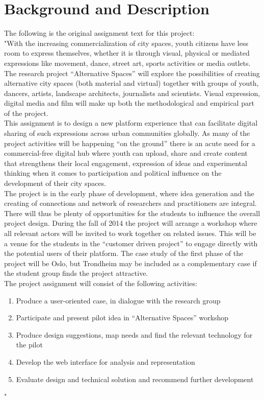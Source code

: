 \section{Background and Description}
The following is the original assignment text for this project: \\
\indent "With the increasing commercialization of city spaces, youth citizens have less room to express themselves, whether it is through visual, physical or mediated expressions like movement, dance, street art, sports activities or media outlets. The research project “Alternative Spaces” will explore the possibilities of creating alternative city spaces (both material and virtual) together with groups of youth, dancers, artists, landscape architects, journalists and scientists. Visual expression, digital media and film will make up both the methodological and empirical part of the project. \\
\indent This assignment is to design a new platform experience that can facilitate digital sharing of such expressions across urban communities globally. As many of the project activities will be happening “on the ground” there is an acute need for a commercial-free digital hub where youth can upload, share and create content that strengthens their local engagement, expression of ideas and experimental thinking when it comes to participation and political influence on the development of their city spaces.\\
\indent The project is in the early phase of development, where idea generation and the creating of connections and network of researchers and practitioners are integral. There will thus be plenty of opportunities for the students to influence the overall project design. During the fall of 2014 the project will arrange a workshop where all relevant actors will be invited to work together on related issues. This will be a venue for the students in the “customer driven project” to engage directly with the potential users of their platform. The case study of the first phase of the project will be Oslo, but Trondheim may be included as a complementary case if the student group finds the project attractive. \\
The project assignment will consist of the following activities:
\begin{enumerate}
\item Produce a user-oriented case, in dialogue with the research group
\item Participate and present pilot idea in “Alternative Spaces” workshop
\item Produce design suggestions, map needs and find the relevant technology for the pilot
\item Develop the web interface for analysis and representation
\item Evaluate design and technical solution and recommend further development
\end{enumerate}"

